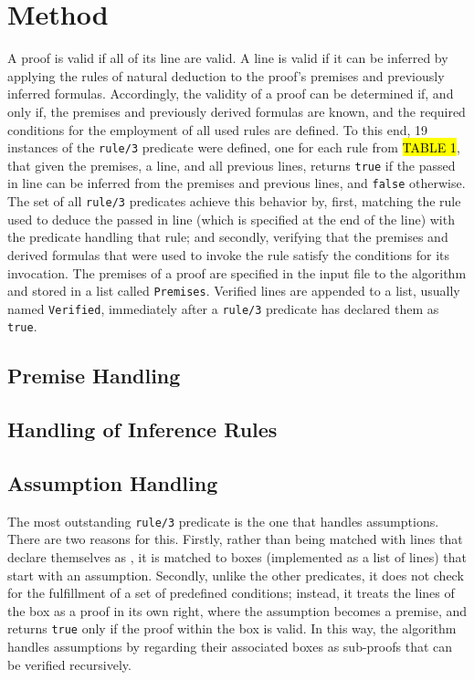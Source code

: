 \documentclass[a4paper, 11pt]{article}
\begin{document}
   \section{Method}
   
   A proof is valid if all of its line are valid. A line is
   valid if it can be inferred by applying the rules of
   natural deduction to the proof's premises and previously
   inferred formulas. Accordingly, the validity of a proof can
   be determined if, and only if, the premises and previously
   derived formulas are known, and the required conditions for
   the employment of all used rules are defined. To this end,
   19 instances of the \texttt{rule/3} predicate were defined,
   one for each rule from \hl{TABLE 1}, that given the
   premises, a line, and all previous lines, returns 
   \texttt{true} if the passed in line can be inferred from
   the premises and previous lines, and \texttt{false}
   otherwise. The set of all \texttt{rule/3} predicates 
   achieve this behavior by, first, matching the rule used to
   deduce the passed in line (which is specified at the end 
   of the line) with the predicate handling that rule; and
   secondly, verifying that the premises and derived formulas 
   that were used to invoke the rule satisfy the conditions 
   for its invocation. The premises of a proof are specified
   in the input file to the algorithm and stored in a list
   called \texttt{Premises}. Verified lines are appended to a 
   list, usually named \texttt{Verified}, immediately after a
   \texttt{rule/3} predicate has declared them as
   \texttt{true}.

   \subsection{Premise Handling}

   \subsection{Handling of Inference Rules}

   \subsection{Assumption Handling}
   The most outstanding \texttt{rule/3} predicate is the one
   that handles assumptions. There are two reasons for this.
   Firstly, rather than being matched with lines that declare
   themselves as , it is matched to
   boxes (implemented as a list of lines) that start with an 
   assumption. Secondly, unlike the other predicates, it does
   not check for the fulfillment of a set of predefined
   conditions; instead, it treats the lines of the box as a
   proof in its own right, where the assumption becomes a
   premise, and returns \texttt{true} only if the proof within
   the box is valid. In this way, the algorithm handles
   assumptions by regarding their associated boxes as 
   sub-proofs that can be verified recursively.
   \bigbreak
\end{document}
